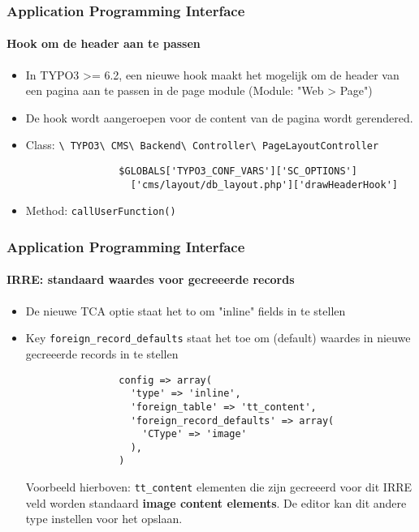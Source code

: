 \begin{frame}[fragile]
	\frametitle{Application Programming Interface}
	\framesubtitle{Hook om de header aan te passen}

	\begin{itemize}
		\item In TYPO3 >= 6.2, een nieuwe hook maakt het mogelijk om de header van een pagina aan te passen in de page module (Module: "Web > Page")
		\item De hook wordt aangeroepen voor de content van de pagina wordt gerendered.
		\item Class:\newline
			\smaller
				\texttt{\textbackslash
					TYPO3\textbackslash
					CMS\textbackslash
					Backend\textbackslash
					Controller\textbackslash
					PageLayoutController}\normalsize

			\lstset{
				basicstyle=\smaller\ttfamily
			}

			\begin{lstlisting}
				$GLOBALS['TYPO3_CONF_VARS']['SC_OPTIONS']
				  ['cms/layout/db_layout.php']['drawHeaderHook']
			\end{lstlisting}

		\item Method:\newline
			\smaller
				\texttt{callUserFunction()}

	\end{itemize}

\end{frame}


\begin{frame}[fragile]
	\frametitle{Application Programming Interface}
	\framesubtitle{IRRE: standaard waardes voor gecreeerde records}

	\begin{itemize}
		\item De nieuwe TCA optie staat het to om "inline" fields in te stellen
		\item Key \texttt{foreign\_record\_defaults} staat het toe om (default) waardes in nieuwe gecreeerde records in te stellen

			\begin{lstlisting}
				config => array(
				  'type' => 'inline',
				  'foreign_table' => 'tt_content',
				  'foreign_record_defaults' => array(
				    'CType' => 'image'
				  ),
				)
			\end{lstlisting}

			\small
				Voorbeeld hierboven: \texttt{tt\_content} elementen die zijn gecreeerd voor dit IRRE veld worden standaard \textbf{image content elements}. De editor kan dit andere type instellen voor het opslaan.
			\normalsize

	\end{itemize}

\end{frame}

